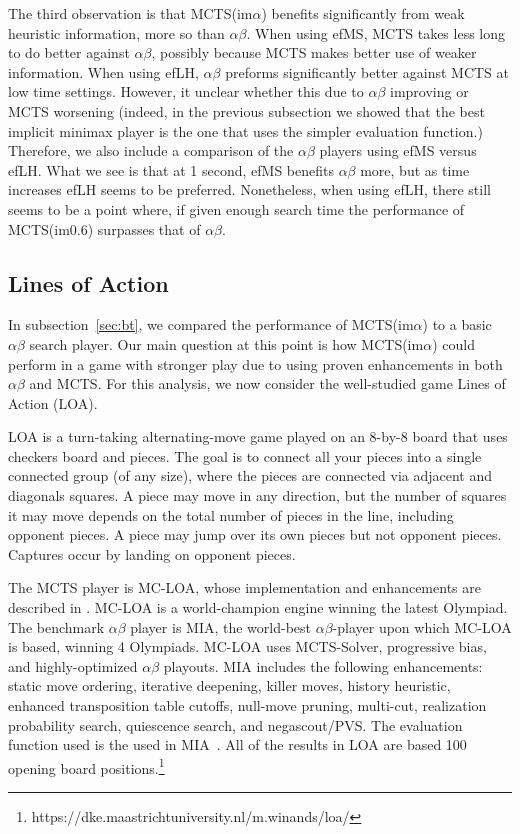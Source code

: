 \documentclass{article}
\begin{document}
The third observation is that MCTS(im$\alpha$) benefits significantly from weak 
heuristic information, more so than $\alpha\beta$. 
When using efMS, MCTS takes less long to do better against $\alpha\beta$, 
possibly because MCTS makes better use of weaker information. 
When using efLH, $\alpha\beta$ preforms significantly better against MCTS at low time settings.  
However, it unclear whether this due to $\alpha\beta$ improving or MCTS worsening (indeed, 
in the previous subsection we showed that the best implicit minimax player is the one that uses 
the simpler evaluation function.) Therefore, we also include a comparison of the $\alpha\beta$ players
using efMS versus efLH. What we see is that at 1 second, efMS benefits $\alpha\beta$ more, but as time 
increases efLH seems to be preferred. 
Nonetheless, when using efLH, there still seems to be a point where, if given enough search time
the performance of MCTS(im$0.6$) surpasses that of $\alpha\beta$. 

\subsection{Lines of Action}

In subsection~\ref{sec:bt}, we compared the performance of MCTS(im$\alpha$) to a basic $\alpha\beta$
search player. Our main question at this point is how MCTS(im$\alpha$) could perform in a game with 
stronger play due to using proven enhancements in both $\alpha\beta$ and MCTS.
For this analysis, we now consider the well-studied game Lines of Action (LOA). 

LOA is a turn-taking alternating-move game played on an 8-by-8 board that uses checkers board and pieces.
The goal is to connect all your pieces into a single connected group (of any size), 
where the pieces are connected via adjacent and diagonals squares. A piece may move in any direction, but the number of squares 
it may move depends on the total number of pieces in the line, including opponent pieces. A piece may jump over its own
pieces but not opponent pieces. Captures occur by landing on opponent pieces. 

The MCTS player is MC-LOA, whose implementation and enhancements are described in \cite{Winands10MCTS-LOA}. 
MC-LOA is a world-champion engine winning the latest Olympiad. The benchmark $\alpha\beta$ player is MIA, the world-best $\alpha\beta$-player 
upon which MC-LOA is based, winning 4 Olympiads. MC-LOA uses MCTS-Solver, progressive bias, and highly-optimized $\alpha\beta$
playouts. MIA includes the following enhancements: static move ordering, iterative deepening, killer moves, history heuristic, enhanced 
transposition table cutoffs, null-move pruning, multi-cut, realization probability search, quiescence search, and negascout/PVS. 
The evaluation function used is the used in MIA~\cite{Winands06MIA}.
All of the results in LOA are based 100 opening board 
positions.\footnote{\small https://dke.maastrichtuniversity.nl/m.winands/loa/} 
\end{document}
